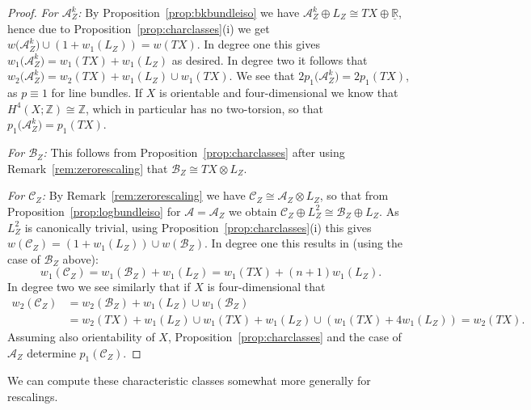 \documentclass[pdftex]{sigma}
\numberwithin{equation}{section}
\begin{document}
\begin{proof}
{\it For $\mathcal{A}_Z^k$:} By Proposition~\ref{prop:bkbundleiso} we have $\mathcal{A}_Z^k \oplus L_Z \cong TX \oplus \underline{\mathbb{R}}$, hence due to Proposition~\ref{prop:charclasses}(i) we get $w\big(\mathcal{A}_Z^k\big)\cup (1 + w_1(L_Z)) = w(TX)$. In degree one this gives $w_1\big(\mathcal{A}_Z^k\big) = w_1(TX) + w_1(L_Z)$ as desired. In degree two it follows that $w_2\big(\mathcal{A}_Z^k\big) = w_2(TX) + w_1(L_Z) \cup w_1(TX)$. We see that $2 p_1\big(\mathcal{A}_Z^k\big) = 2 p_1(TX)$, as $p \equiv 1$ for line bundles. If $X$ is orientable and four-dimensional we know that $H^4(X;\mathbb{Z}) \cong \mathbb{Z}$, which in particular has no two-torsion, so that $p_1\big(\mathcal{A}_Z^k\big) = p_1(TX)$.

{\it For $\mathcal{B}_Z$:} This follows from Proposition~\ref{prop:charclasses} after using Remark~\ref{rem:zerorescaling} that $\mathcal{B}_Z \cong TX \otimes L_Z$.

{\it For $\mathcal{C}_Z$:} By Remark~\ref{rem:zerorescaling} we have $\mathcal{C}_Z \cong \mathcal{A}_Z \otimes L_Z$, so that from Proposition~\ref{prop:logbundleiso} for $\mathcal{A} = \mathcal{A}_Z$ we obtain $\mathcal{C}_Z \oplus L_Z^2 \cong \mathcal{B}_Z \oplus L_Z$. As $L_Z^2$ is canonically trivial, using Proposition~\ref{prop:charclasses}(i) this gives $w(\mathcal{C}_Z) = (1 + w_1(L_Z)) \cup w(\mathcal{B}_Z)$. In degree one this results in (using the case of $\mathcal{B}_Z$ above):
\begin{displaymath}
	w_1(\mathcal{C}_Z) = w_1(\mathcal{B}_Z) + w_1(L_Z) = w_1(TX) + (n+1)w_1(L_Z).
\end{displaymath}
In degree two we see similarly that if $X$ is four-dimensional that
\begin{align*}
w_2(\mathcal{C}_Z) &= w_2(\mathcal{B}_Z) + w_1(L_Z) \cup w_1(\mathcal{B}_Z) \\
&=w_2(TX) + w_1(L_Z) \cup w_1(TX) + w_1(L_Z) \cup (w_1(TX) + 4 w_1(L_Z)) = w_2(TX).
\end{align*}
Assuming also orientability of $X$, Proposition~\ref{prop:charclasses} and the case of $\mathcal{A}_Z$ determine $p_1(\mathcal{C}_Z)$.
\end{proof}

We can compute these characteristic classes somewhat more generally for rescalings.
\end{document}
